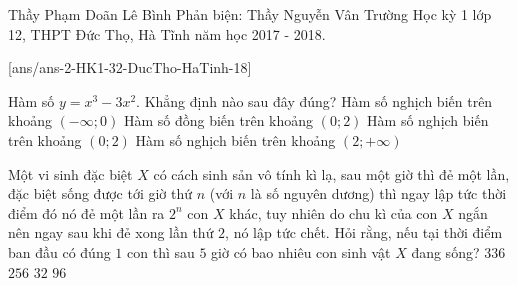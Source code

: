 \begin{name}
{Thầy Phạm Doãn Lê Bình
	\newline Phản biện: Thầy Nguyễn Vân Trường}
{Học kỳ 1 lớp 12, THPT Đức Thọ, Hà Tĩnh năm học 2017 - 2018.}
\end{name}
\setcounter{ex}{0}\setcounter{bt}{0}
[ans/ans-2-HK1-32-DucTho-HaTinh-18]
\begin{ex}%
Hàm số $y=x^3-3x^2$. Khẳng định nào sau đây đúng?
\choice
{Hàm số nghịch biến trên khoảng $(-\infty; 0)$}
{Hàm số đồng biến trên khoảng $(0; 2)$}
{\True Hàm số nghịch biến trên khoảng $(0;2)$}
{Hàm số nghịch biến trên khoảng $(2;+\infty)$}
\end{ex}

\begin{ex}%
 Một vi sinh đặc biệt $X$ có cách sinh sản vô tính kì lạ, sau một giờ thì đẻ một lần, đặc biệt sống được tới giờ thứ $n$ (với $n$ là số nguyên dương) thì ngay lập tức thời điểm đó nó đẻ một lần ra $2^n$ con $X$ khác, tuy nhiên do chu kì của con $X$ ngắn nên ngay sau khi đẻ xong lần thứ $2$, nó lập tức chết. Hỏi rằng, nếu tại thời điểm ban đầu có đúng $1$ con thì sau $5$ giờ có bao nhiêu con sinh vật $X$ đang sống?
\choice
{\True $336$}
{$256$}
{$32$}
{$96$}
\end{ex}

